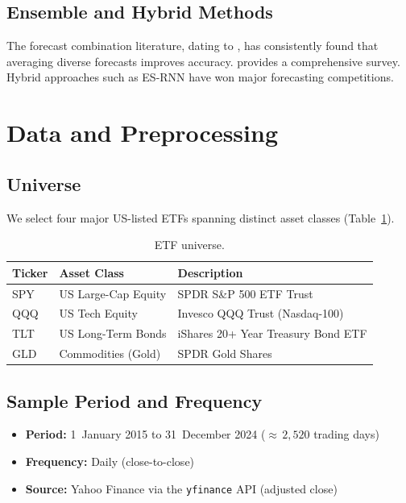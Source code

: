 \documentclass[11pt,a4paper,twocolumn]{article}
\begin{document}
\subsection{Ensemble and Hybrid Methods}

The forecast combination literature, dating to \citet{bates1969}, has
consistently found that averaging diverse forecasts improves accuracy.
\citet{timmermann2006} provides a comprehensive survey.  Hybrid approaches such
as ES-RNN \citep{smyl2020} have won major forecasting competitions.


\section{Data and Preprocessing}\label{sec:data}

\subsection{Universe}

We select four major US-listed ETFs spanning distinct asset classes
(Table~\ref{tab:universe}).

\begin{table}[H]
\centering
\caption{ETF universe.}
\label{tab:universe}
\small
\begin{tabular}{@{}llp{3.8cm}@{}}
\toprule
\textbf{Ticker} & \textbf{Asset Class} & \textbf{Description} \\
\midrule
SPY & US Large-Cap Equity   & SPDR S\&P 500 ETF Trust \\
QQQ & US Tech Equity        & Invesco QQQ Trust (Nasdaq-100) \\
TLT & US Long-Term Bonds    & iShares 20+ Year Treasury Bond ETF \\
GLD & Commodities (Gold)    & SPDR Gold Shares \\
\bottomrule
\end{tabular}
\end{table}

\subsection{Sample Period and Frequency}

\begin{itemize}[leftmargin=*,itemsep=1pt]
    \item \textbf{Period:} 1~January 2015 to 31~December 2024 (${\approx}\,2{,}520$ trading days)
    \item \textbf{Frequency:} Daily (close-to-close)
    \item \textbf{Source:} Yahoo Finance via the \texttt{yfinance} API (adjusted close)
\end{itemize}
\end{document}
